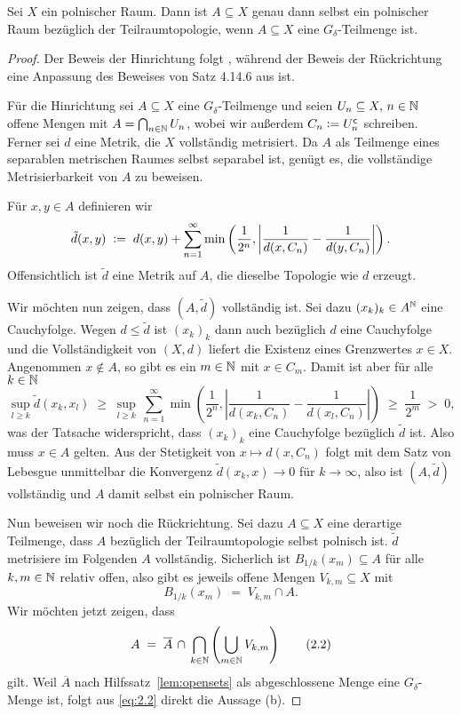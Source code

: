 \documentclass[../main/main.tex]{subfiles}
\begin{document}
	\begin{Satz}[Alexandroff]
		\label{thm:gdeltasubsetsofpolishspaces}
		Sei $X$ ein polnischer Raum. Dann ist $A \subseteq X$ genau dann selbst ein polnischer Raum bezüglich der Teilraumtopologie, 
		wenn $A \subseteq X$ eine $G_\delta$-Teilmenge ist.
	\end{Satz}

	\begin{proof}
		Der Beweis der Hinrichtung folgt \cite[Satz 7]{JordanBell.2014}, während der Beweis der Rückrichtung eine Anpassung des Beweises
		von Satz 4.14.6 aus \cite[Kapitel 4.14]{Simon.2015} ist.
		
		Für die Hinrichtung sei $A \subseteq X$ eine $G_\delta$-Teilmenge und seien 
		$U_n \subseteq X, \, n \in \mathbb{N}$ offene Mengen mit 
		$A = \bigcap_{n \in \mathbb{N}} U_n$, wobei wir außerdem 
		$C_n \vcentcolon = U_n^{\mathsf{c}}$ schreiben. Ferner sei 
		$d$ eine Metrik, die $X$ vollständig metrisiert. 
		Da $A$ als Teilmenge eines separablen metrischen Raumes 
		selbst separabel ist, genügt es, die vollständige Metrisierbarkeit 
		von $A$ zu beweisen.
		
		Für $x, y \in A$ definieren wir
		\[\tilde{d}(x, y) \; \vcentcolon = \; d(x, y) + \sum_{n=1}^{\infty} \min \left(
		\frac{1}{2^n}, \left| \frac{1}{d(x, C_n)} - \frac{1}{d(y, C_n)} \right|
		\right) \text{.}\]
		Offensichtlich ist $\tilde{d}$ eine Metrik auf $A$, 
		die dieselbe Topologie wie $d$ erzeugt. 
		
		Wir möchten nun zeigen, dass $(A, \tilde{d})$ vollständig ist. 
		Sei dazu $(x_k)_k \in A^{\mathbb{N}}$ eine Cauchyfolge. Wegen $d \leq \tilde{d}$ 
		ist $(x_k)_k$ dann auch bezüglich $d$ eine Cauchyfolge und die 
		Vollständigkeit von $(X, d)$ liefert die Existenz eines Grenzwertes 
		$x \in X$. Angenommen $x \notin A$, so gibt es ein $m \in \mathbb{N}$ mit 
		$x \in C_m$. Damit ist aber für alle $k \in \mathbb{N}$
		$$\sup_{l \geq k} \tilde{d}(x_k, x_l) \; \geq \; \sup_{l \geq k} 
		\, \sum_{n=1}^{\infty} \min \left(
		\frac{1}{2^n}, \left| \frac{1}{d(x_k, C_n)} -
		\frac{1}{d(x_l, C_n)} \right|
		\right) \; \geq \; \frac{1}{2^m} \; > \; 0 \text{,}$$
		was der Tatsache widerspricht, dass $(x_k)_k$ eine Cauchyfolge 
		bezüglich $\tilde{d}$ ist. Also muss $x \in A$ gelten. 
		Aus der Stetigkeit von $x \mapsto d(x, C_n)$ folgt mit dem 
		Satz von Lebesgue unmittelbar die Konvergenz 
		$\tilde{d}(x_k, x) \to 0$ für $k \to \infty$,
		also ist $(A, \tilde{d})$ vollständig und $A$ damit selbst ein
		polnischer Raum.
		
		Nun beweisen wir noch die Rückrichtung. Sei dazu $A \subseteq X$ eine derartige Teilmenge, dass
		$A$ bezüglich der Teilraumtopologie selbst polnisch ist. $\tilde{d}$ metrisiere im Folgenden 
		$A$ vollständig.
		Sicherlich ist $B_{1/k}(x_m) \subseteq A$ für alle 
		$k, m \in \mathbb{N}$ relativ offen, also gibt es jeweils offene Mengen 
		$V_{k, m} \subseteq X$ mit
		\[ B_{1/k}(x_m) \; = \; V_{k, m} 
		\cap A \text{.} \label{eq:2.1} \tag{2.1}\]
		Wir möchten jetzt zeigen, dass
		\[ A \; = \; \overline{A} \, \cap \, 
		\bigcap_{k \in \mathbb{N}} \left( \bigcup_{m \in \mathbb{N}} V_{k, m} \right) 
		\label{eq:2.2} \tag{2.2}\]
		gilt. 
		Weil $\overline{A}$ nach Hilfssatz~\ref{lem:opensets} 
		als abgeschlossene Menge eine $G_\delta$-Menge ist, 
		folgt aus \eqref{eq:2.2} direkt die Aussage (b).
		

\end{proof}
\end{document}
